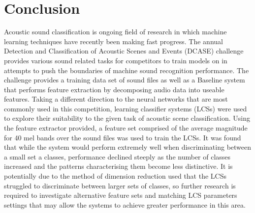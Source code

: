 \documentclass[11pt]{article}
\begin{document}
\section{Conclusion}

Acoustic sound classification is ongoing field of research in which machine learning techniques have recently been making fast progress. The annual Detection and Classification of Acoustic Scenes and Events (DCASE) challenge provides various sound related tasks for competitors to train models on in attempts to push the boundaries of machine sound recognition performance. The challenge provides a training data set of sound files as well as a Baseline system that performs feature extraction by decomposing audio data into useable features. Taking a different direction to the neural networks that are most commonly used in this competition, learning classifier systems (LCSs) were used to explore their suitability to the given task of acoustic scene classification. Using the feature extractor provided, a feature set comprised of the average magnitude for 40 mel bands over the sound files was used to train the LCSs. It was found that while the system would perform extremely well when discriminating between a small set a classes, performance declined steeply as the number of classes increased and the patterns characterising them become less distinctive. It is potentially due to the method of dimension reduction used that the LCSs struggled to discriminate between larger sets of classes, so further research is required to investigate alternative feature sets and matching LCS parameters settings that may allow the systems to achieve greater performance in this area.




\pagebreak



\end{document}
